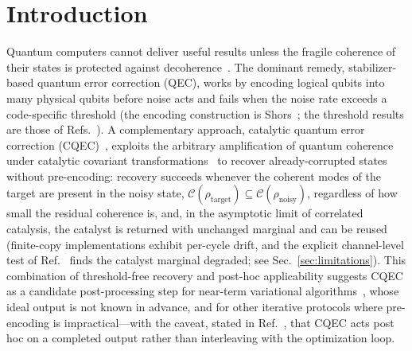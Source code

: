 \documentclass[pra,twocolumn,superscriptaddress,longbibliography,floatfix,nofootinbib]{revtex4-2}
\newcommand{\CC}{\mathcal{C}}
\newcommand{\rhot}{\rho_\mathrm{target}}
\newcommand{\rhon}{\rho_\mathrm{noisy}}
\begin{document}
 

 
\section{Introduction}
\label{sec:introduction}

Quantum computers cannot deliver useful results unless the fragile coherence of their states is protected against decoherence~\cite{NielsenChuang2010}.
The dominant remedy, stabilizer-based quantum error correction (QEC), works by encoding logical qubits into many physical qubits before noise acts and fails when the noise rate exceeds a code-specific threshold (the encoding construction is Shor\textquotesingle s~\cite{Shor1995}; the threshold results are those of Refs.~\cite{Gottesman1997,Knill2005}).
A complementary approach, catalytic quantum error correction (CQEC)~\cite{Wakaura2026unified}, exploits the arbitrary amplification of quantum coherence under catalytic covariant transformations~\cite{Takagi2022correlation,Shiraishi2024} to recover already-corrupted states without pre-encoding: recovery succeeds whenever the coherent modes of the target are present in the noisy state, $\CC(\rhot) \subseteq \CC(\rhon)$, regardless of how small the residual coherence is, and, in the asymptotic limit of correlated catalysis, the catalyst is returned with unchanged marginal and can be reused~\cite{Shiraishi2024,Wakaura2026unified} (finite-copy implementations exhibit per-cycle drift, and the explicit channel-level test of Ref.~\cite{Wakaura2026unified} finds the catalyst marginal degraded; see Sec.~\ref{sec:limitations}).
This combination of threshold-free recovery and post-hoc applicability suggests CQEC as a candidate post-processing step for near-term variational algorithms~\cite{Peruzzo2014,Cerezo2021}, whose ideal output is not known in advance, and for other iterative protocols where pre-encoding is impractical---with the caveat, stated in Ref.~\cite{Wakaura2026unified}, that CQEC acts post hoc on a completed output rather than interleaving with the optimization loop.
\end{document}
